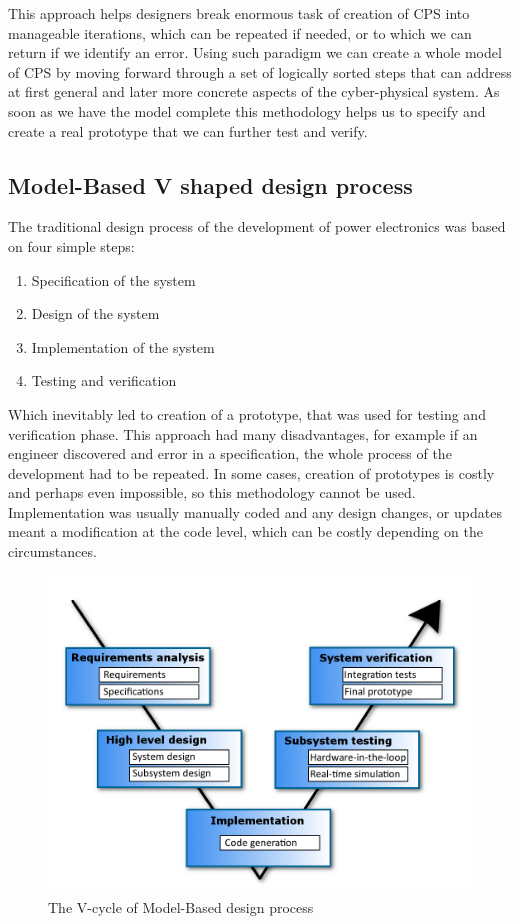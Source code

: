 \documentclass[english,technical,10pt]{FITreport}[2018/01/26]
\begin{document}
This approach helps designers break enormous task of creation of CPS into manageable iterations, which can be repeated if needed, or to which we can return if we identify an error. Using such paradigm we can create a whole model of CPS by moving forward through a set of logically sorted steps that can address at first general and later more concrete aspects of the cyber-physical system. As soon as we have the model complete this methodology helps us to specify and create a real prototype that we can further test and verify.

\subsection{Model-Based V shaped design process}

The traditional design process of the development of power electronics was based on four simple steps:

\begin{enumerate}
\item Specification of the system
\item Design of the system
\item Implementation of the system
\item Testing and verification
\end{enumerate}

Which inevitably led to creation of a prototype, that was used for testing and verification phase. This approach had many disadvantages, for example if an engineer discovered and error in a specification, the whole process of the development had to be repeated. In some cases, creation of prototypes is costly and perhaps even impossible, so this methodology cannot be used. Implementation was usually manually coded and any design changes, or updates meant a modification at the code level, which can be costly depending on the circumstances.

\begin{figure}
\centering
\includegraphics[scale=0.35]{pictures/model_based_design_Vcycle.png}
\caption{The V-cycle of Model-Based design process}
\label{fig:modelBasedDesignProcess}
\end{figure}
\end{document}
